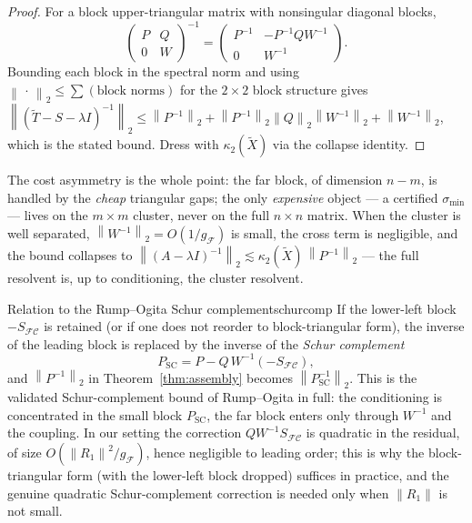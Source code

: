 \documentclass[11pt, a4paper]{article}
\numberwithin{equation}{section}
\newcommand{\norm}[1]{\left\|#1\right\|}
\newcommand{\tX}{\widetilde{X}}
\newcommand{\tT}{\widetilde{T}}
\begin{document}
\begin{proof}
For a block upper-triangular matrix with nonsingular diagonal blocks,
\[
  \begin{pmatrix} P & Q \\ 0 & W \end{pmatrix}^{-1}
    = \begin{pmatrix} P^{-1} & -P^{-1}QW^{-1} \\ 0 & W^{-1} \end{pmatrix}.
\]
Bounding each block in the spectral norm and using $\norm{\,\cdot\,}_2 \le
\sum(\text{block norms})$ for the $2\times 2$ block structure gives
$\norm{(\tT - S - \lambda I)^{-1}}_2 \le \norm{P^{-1}}_2 + \norm{P^{-1}}_2
\norm{Q}_2\norm{W^{-1}}_2 + \norm{W^{-1}}_2$, which is the stated bound.  Dress
with $\kappa_2(\tX)$ via the collapse identity.
\end{proof}

The cost asymmetry is the whole point: the far block, of dimension $n - m$, is
handled by the \emph{cheap} triangular gaps; the only \emph{expensive} object
--- a certified $\sigma_{\min}$ --- lives on the $m\times m$ cluster, never on
the full $n\times n$ matrix.  When the cluster is well separated,
$\norm{W^{-1}}_2 = O(1/g_{\mathcal{F}})$ is small, the cross term is negligible,
and the bound collapses to $\norm{(A-\lambda I)^{-1}}_2 \lesssim
\kappa_2(\tX)\,\norm{P^{-1}}_2$ --- the full resolvent is, up to conditioning,
the cluster resolvent.

\begin{remark}{Relation to the Rump--Ogita Schur complement}{schurcomp}
  If the lower-left block $-S_{\mathcal{F}\mathcal{C}}$ is retained \textup{(}or
  if one does not reorder to block-triangular form\textup{)}, the inverse of the
  leading block is replaced by the inverse of the \emph{Schur complement}
  \[
    P_{\mathrm{SC}} = P - Q\,W^{-1}(-S_{\mathcal{F}\mathcal{C}}),
  \]
  and $\norm{P^{-1}}_2$ in Theorem~\ref{thm:assembly} becomes
  $\norm{P_{\mathrm{SC}}^{-1}}_2$.  This is the validated Schur-complement bound
  of Rump--Ogita in full: the conditioning is concentrated in the small block
  $P_{\mathrm{SC}}$, the far block enters only through $W^{-1}$ and the
  coupling.  In our setting the correction $Q W^{-1} S_{\mathcal{F}\mathcal{C}}$
  is quadratic in the residual, of size $O(\norm{R_1}^2/g_{\mathcal{F}})$, hence
  negligible to leading order; this is why the block-triangular form
  \textup{(}with the lower-left block dropped\textup{)} suffices in practice, and
  the genuine quadratic Schur-complement correction is needed only when
  $\norm{R_1}$ is not small.
\end{remark}
\end{document}
